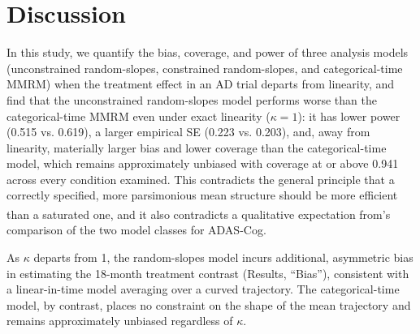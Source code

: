 \documentclass[
  11pt,
]{article}
\begin{document}
\FloatBarrier

\section{Discussion}\label{discussion}

In this study, we quantify the bias, coverage, and power of
three analysis models (unconstrained random-slopes, constrained
random-slopes, and categorical-time MMRM) when the treatment
effect in an AD trial departs from linearity, and find that the
unconstrained random-slopes model performs worse than the
categorical-time MMRM even under exact linearity (\(\kappa = 1\)):
it has lower power
(0.515 vs.
0.619), a larger empirical SE
(0.223 vs.
0.203), and, away from
linearity, materially larger bias and lower coverage than the
categorical-time model, which remains approximately unbiased
with coverage at or above
0.941 across every condition
examined. This contradicts the general
principle that a correctly specified, more parsimonious mean
structure should be more efficient than a saturated one\textsuperscript{}, and it also contradicts a
qualitative expectation from\textsuperscript{}'s comparison
of the two model classes for ADAS-Cog.

As \(\kappa\) departs from 1, the random-slopes model incurs
additional, asymmetric bias in estimating the 18-month
treatment contrast (Results, ``Bias''), consistent with a
linear-in-time model averaging over a curved trajectory. The
categorical-time model, by contrast, places no constraint on
the shape of the mean trajectory and remains approximately
unbiased regardless of \(\kappa\).
\end{document}
